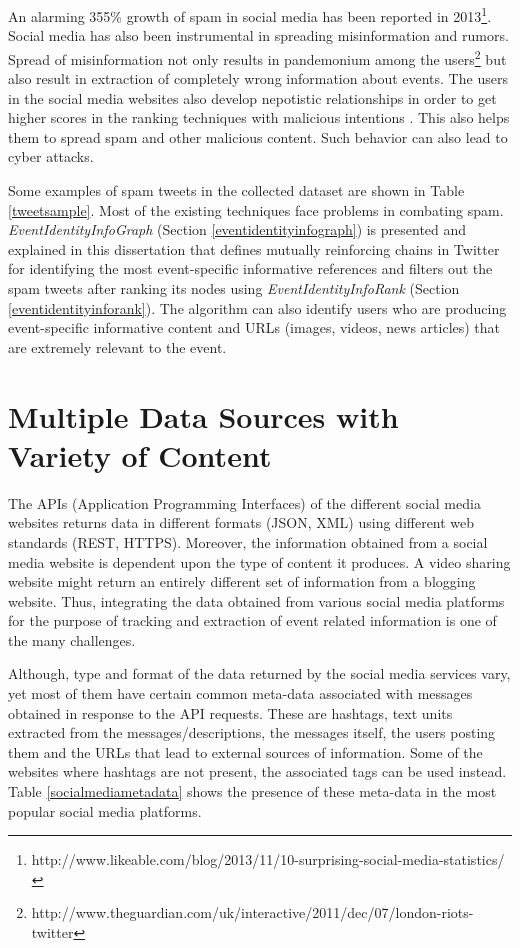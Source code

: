 An alarming 355\% growth of spam in social media has been reported in 2013\footnote{http://www.likeable.com/blog/2013/11/10-surprising-social-media-statistics/}. Social media has also been instrumental in spreading misinformation and rumors. Spread of misinformation not only results in pandemonium among the users\footnote{http://www.theguardian.com/uk/interactive/2011/dec/07/london-riots-twitter}  but also result in extraction of completely wrong information about events. The users in the social media websites also develop nepotistic relationships in order to get higher scores in the ranking techniques with malicious intentions \cite{gayo2013nepotistic}. This also helps them to spread spam and other malicious content. Such behavior can also lead to cyber attacks.

Some examples of spam tweets in the collected dataset are shown in Table \ref{tweetsample}. Most of the existing techniques face problems in combating spam.  \textit{EventIdentityInfoGraph} (Section \ref{eventidentityinfograph}) is presented and explained in this dissertation that defines mutually reinforcing chains in Twitter for identifying the most event-specific informative references and filters out the spam tweets after ranking its nodes using \textit{EventIdentityInfoRank} (Section \ref{eventidentityinforank}). The algorithm can also identify users who are producing event-specific informative content and URLs (images, videos, news articles) that are extremely relevant to the event. 

\section{Multiple Data Sources with Variety of Content}
The APIs (Application Programming Interfaces) of the different social media websites returns data in different formats (JSON, XML) using different web standards (REST, HTTPS). Moreover, the information obtained from a social media website is dependent upon the type of content it produces. A video sharing website might return an entirely different set of information from a blogging website. Thus, integrating the data obtained from various social media platforms for the purpose of tracking and extraction of event related information is one of the many challenges.

Although, type and format of the data returned by the social media services vary, yet most of them have certain common meta-data associated with messages obtained in response to the API requests. These are hashtags, text units extracted from the messages/descriptions, the messages itself, the users posting them and the URLs that lead to external sources of information. Some of the websites where hashtags are not present, the associated tags can be used instead. Table \ref{socialmediametadata} shows the presence of these meta-data in the most popular social media platforms.

